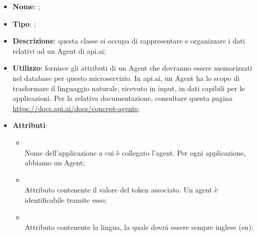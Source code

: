 \begin{itemize}
	\item \textbf{Nome}: ;
	\item \textbf{Tipo}: ;
	\item \textbf{Descrizione}: questa classe si occupa di rappresentare e organizzare i dati relativi ad un Agent di api.ai;
	\item \textbf{Utilizzo}: fornisce gli attributi di un Agent che dovranno essere memorizzati nel database per questo microservizio.
In api.ai, un Agent ha lo scopo di trasformare il linguaggio naturale, ricevuto in input, in dati capibili per le applicazioni.
Per la relativa documentazione, consultare questa pagina \url{https://docs.api.ai/docs/concept-agents};
	\item \textbf{Attributi}:
	\begin{itemize}
		\item[]  \\
		Nome dell'applicazione a cui è collegato l'agent.
Per ogni applicazione, abbiamo un Agent;
		\item[]  \\
		Attributo contenente il valore del token associato. Un agent è identificabile tramite esso;
		\item[]  \\
		Attributo contenente la lingua, la quale dovrà essere sempre inglese (en);
	\end{itemize}
\end{itemize}


